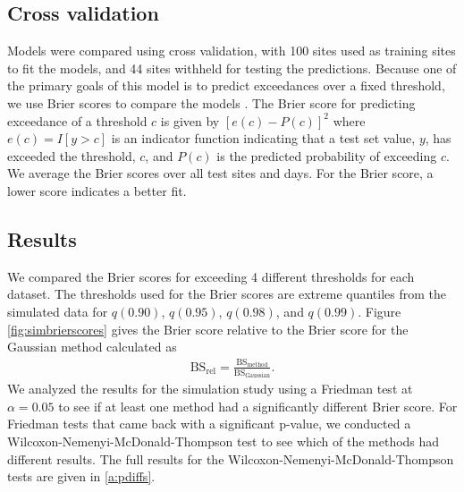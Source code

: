 \documentclass[useAMS,usenatbib,referee]{biom}
\begin{document}
\subsection{Cross validation}\label{s:modelselect}
Models were compared using cross validation, with 100 sites used as training sites to fit the models, and 44 sites withheld for testing the predictions.
Because one of the primary goals of this model is to predict exceedances over a fixed threshold, we use Brier scores to compare the models \citep{Gneiting2007}.
The Brier score for predicting exceedance of a threshold $c$ is given by $[e(c) - P(c)]^2$ where $e(c) = I[y>c]$ is an indicator function indicating that a test set value, $y$, has exceeded the threshold, $c$, and $P(c)$ is the predicted probability of exceeding $c$.
We average the Brier scores over all test sites and days.
For the Brier score, a lower score indicates a better fit.

\subsection{Results}\label{s:simresults}
We compared the Brier scores for exceeding 4 different thresholds for each dataset.
The thresholds used for the Brier scores are extreme quantiles from the simulated data for $q(0.90)$, $q(0.95)$, $q(0.98)$, and $q(0.99)$.
Figure \ref{fig:simbrierscores} gives the Brier score relative to the Brier score for the Gaussian method calculated as
\begin{align}
  \text{BS}_{\text{rel}} = \frac{\text{BS}_{\text{method}}}{\text{BS}_{\text{Gaussian}}}.
\end{align}
We analyzed the results for the simulation study using a Friedman test at $\alpha = 0.05$ to see if at least one method had a significantly different Brier score.
For Friedman tests that came back with a significant p-value, we conducted a Wilcoxon-Nemenyi-McDonald-Thompson test to see which of the methods had different results.
The full results for the Wilcoxon-Nemenyi-McDonald-Thompson tests are given in \ref{a:pdiffs}.
\end{document}
